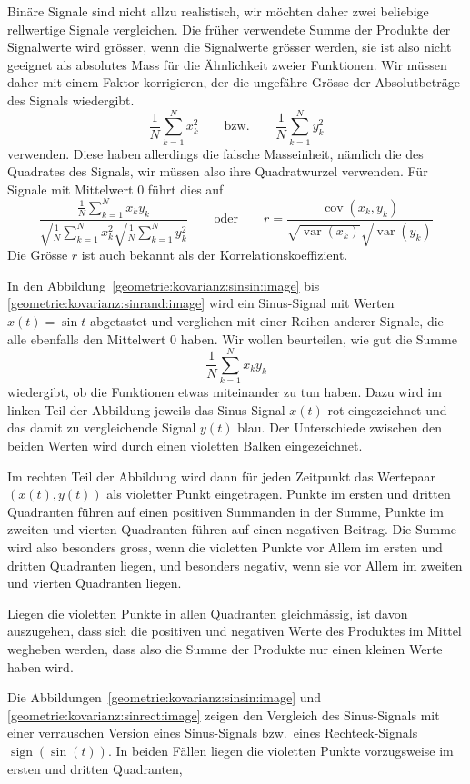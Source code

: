 Binäre Signale sind nicht allzu realistisch, wir möchten daher zwei
beliebige rellwertige Signale vergleichen.
Die früher verwendete Summe der Produkte der Signalwerte wird grösser,
wenn die Signalwerte grösser werden, sie ist also nicht geeignet als
absolutes Mass für die Ähnlichkeit zweier Funktionen.
Wir müssen daher mit einem Faktor korrigieren, der die ungefähre
Grösse der Absolutbeträge des Signals wiedergibt.
\[
\frac1{N}
\sum_{k=1}^N x_k^2
\qquad\text{bzw.}\qquad
\frac1{N}
\sum_{k=1}^N y_k^2
\]
verwenden.
Diese haben allerdings die falsche Masseinheit, nämlich die des
Quadrates des Signals, wir müssen also ihre Quadratwurzel verwenden.
Für Signale mit Mittelwert $0$ führt dies auf
\[
\frac{
\frac{1}{N}\sum_{k=1}^N x_ky_k
}{
\sqrt{\frac{1}{N}\sum_{k=1}^N x_k^2}
\sqrt{\frac{1}{N}\sum_{k=1}^N y_k^2}
}
\qquad\text{oder}\qquad
r
=
\frac{\operatorname{cov}(x_k,y_k)}{\sqrt{\operatorname{var}(x_k)}\sqrt{\operatorname{var}(y_k)}}
\]
Die Grösse $r$ ist auch bekannt als der Korrelationskoeffizient.

In den Abbildung~\ref{geometrie:kovarianz:sinsin:image} bis
\ref{geometrie:kovarianz:sinrand:image} wird ein Sinus-Signal
mit Werten $x(t)=\sin t$ abgetastet und verglichen mit
einer Reihen anderer Signale,
die alle ebenfalls den Mittelwert $0$ haben.
Wir wollen beurteilen, wie gut die Summe
\[
\frac{1}{N}\sum_{k=1}^N x_ky_k
\]
wiedergibt, ob die Funktionen etwas miteinander zu tun haben.
Dazu wird im linken Teil der Abbildung jeweils das Sinus-Signal
$x(t)$ rot eingezeichnet und das damit zu vergleichende Signal $y(t)$
blau.
Der Unterschiede zwischen den beiden Werten wird durch einen 
violetten Balken eingezeichnet.

Im rechten Teil der Abbildung wird dann für jeden Zeitpunkt
das Wertepaar $(x(t),y(t))$ als violetter Punkt eingetragen.
Punkte im ersten und dritten Quadranten führen auf einen positiven
Summanden in der Summe, Punkte im zweiten und vierten Quadranten
führen auf einen negativen Beitrag.
Die Summe wird also besonders gross, wenn die violetten Punkte vor
Allem im ersten und dritten Quadranten liegen, und besonders negativ,
wenn sie vor Allem im zweiten und vierten Quadranten liegen.

Liegen die violetten Punkte in allen Quadranten gleichmässig, ist
davon auszugehen, dass sich die positiven und negativen Werte des
Produktes im Mittel wegheben werden, dass also die Summe der
Produkte nur einen kleinen Werte haben wird.

Die Abbildungen~\ref{geometrie:kovarianz:sinsin:image} und
\ref{geometrie:kovarianz:sinrect:image} zeigen den Vergleich
des Sinus-Signals mit einer verrauschen Version eines Sinus-Signals
bzw.~eines Rechteck-Signals $\operatorname{sign}(\sin(t))$.
In beiden Fällen liegen die violetten Punkte vorzugsweise im ersten
und dritten Quadranten, 

